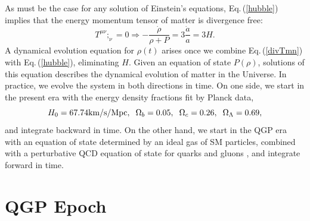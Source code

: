 \documentclass[Universe,article,submit,moreauthors,pdftex]{Definitions/mdpi}
\newcommand{\beqn}{\begin{equation}}
\newcommand{\eeqn}{\end{equation}}
\newcommand{\req}[1]{Eq.\,(\ref{#1})}
\begin{document}
As must be the case for any solution of Einstein's equations,   \req{hubble} implies that the energy momentum tensor of matter is divergence free:
\beqn\label{divTmn}
T^{\mu\nu};_\nu =0 \Rightarrow -\frac{\dot\rho}{\rho+P}=3\frac{\dot a}{a}=3H.
\eeqn
A dynamical evolution equation for $\rho(t)$ arises once we combine \req{divTmn} with \req{hubble},  eliminating $H$.   Given an equation of state $P(\rho)$, solutions of this equation describes the dynamical evolution of matter in the Universe. In practice, we evolve the system in both directions in time.  On one side, we start in the present era with the energy density fractions fit by Planck data, 
\cite{Planck}
\begin{equation}\label{Planck_params}
H_0=67.74\text{km/s/Mpc},\hspace{2mm} \Omega_b=0.05,\hspace{2mm} \Omega_c=0.26, \hspace{2mm}\Omega_\Lambda=0.69,
\end{equation}
 and integrate backward in time.  On the other hand, we start in the QGP era with an equation of state determined by an ideal gas of SM particles, combined with a perturbative QCD equation of state for quarks and gluons \cite{Borsanyi:2013bia}, and integrate forward in time.

\section{QGP Epoch}\label{sec:QGP}
\end{document}

